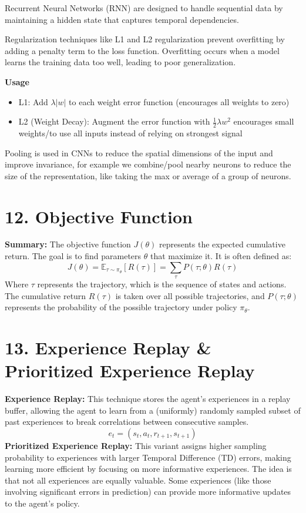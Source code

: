 \documentclass[letterpaper,10pt]{article}
\begin{document}
\begin{multicols}{2}
\noindent Recurrent Neural Networks (RNN) are designed to handle sequential data by maintaining a hidden state that captures temporal dependencies.

\noindent Regularization techniques like L1 and L2 regularization prevent overfitting by adding a penalty term to the loss function. Overfitting occurs when a model learns the training data too well, leading to poor generalization.

\noindent \textbf{Usage}
\begin{itemize}
    \item L1: Add \( \lambda |w| \) to each weight error function (encourages all weights to zero)
    \item L2 (Weight Decay): Augment the error function with \( \frac{1}{2} \lambda w^2 \) encourages small weights/to use all inputs instead of relying on strongest signal
\end{itemize}
Pooling is used in CNNs to reduce the spatial dimensions of the input and improve invariance, for example we combine/pool nearby neurons to reduce the size of the representation, like taking the max or average of a group of neurons.

\section*{12. Objective Function}
\textbf{Summary:} The objective function \( J(\theta) \) represents the expected cumulative return. The goal is to find parameters \( \theta \) that maximize it. It is often defined as:
\[
J(\theta) = \mathbb{E}_{\tau \sim \pi_\theta} [R(\tau)] = \sum_{\tau} P(\tau;\theta)R(\tau)
\]
Where \( \tau \) represents the trajectory, which is the sequence of states and actions. The cumulative return \( R(\tau) \) is taken over all possible trajectories, and \( P(\tau;\theta) \) represents the probability of the possible trajectory under policy \( \pi_\theta \).

\section*{13. Experience Replay \& Prioritized Experience Replay}
\textbf{Experience Replay:} This technique stores the agent's experiences in a replay buffer, allowing the agent to learn from a (uniformly) randomly sampled subset of past experiences to break correlations between consecutive samples.
\[
e_t = (s_t, a_t, r_{t+1}, s_{t+1})
\]
\textbf{Prioritized Experience Replay:} This variant assigns higher sampling probability to experiences with larger Temporal Difference (TD) errors, making learning more efficient by focusing on more informative experiences. The idea is that not all experiences are equally valuable. Some experiences (like those involving significant errors in prediction) can provide more informative updates to the agent's policy.


\end{multicols}
\end{document}

